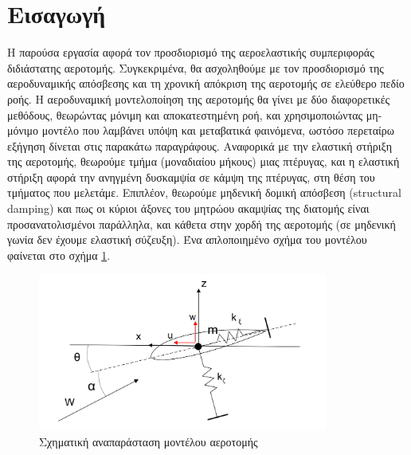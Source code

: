 \section*{Εισαγωγή}

Η παρούσα εργασία αφορά τον προσδιορισμό της αεροελαστικής συμπεριφοράς διδιάστατης αεροτομής. Συγκεκριμένα, θα ασχοληθούμε με τον προσδιορισμό της αεροδυναμικής απόσβεσης και τη χρονική απόκριση της αεροτομής σε ελεύθερο πεδίο ροής. Η αεροδυναμική μοντελοποίηση της αεροτομής θα γίνει με δύο διαφορετικές μεθόδους, θεωρώντας μόνιμη και αποκατεστημένη ροή, και χρησιμοποιώντας μη-μόνιμο μοντέλο που λαμβάνει υπόψη και μεταβατικά φαινόμενα, ωστόσο περεταίρω εξήγηση δίνεται στις παρακάτω παραγράφους. Αναφορικά με την ελαστική στήριξη της αεροτομής, θεωρούμε τμήμα (μοναδιαίου μήκους) μιας πτέρυγας, και η ελαστική στήριξη αφορά την ανηγμένη δυσκαμψία σε κάμψη της πτέρυγας, στη θέση του τμήματος που μελετάμε. Επιπλέον, θεωρούμε μηδενική δομική απόσβεση (structural damping) και πως οι κύριοι άξονες του μητρώου ακαμψίας της διατομής είναι προσανατολισμένοι παράλληλα, και κάθετα στην χορδή της αεροτομής (σε μηδενική γωνία δεν έχουμε ελαστική σύζευξη). Ένα απλοποιημένο σχήμα του μοντέλου φαίνεται στο σχήμα \ref{fig:sxima}. 

\begin{figure}[ht!]
    \begin{center}
        \includegraphics[width=0.85\textwidth]{./figures/sxima.png}
    \end{center}
    \caption{Σχηματική αναπαράσταση μοντέλου αεροτομής}
    \label{fig:sxima}
\end{figure}



